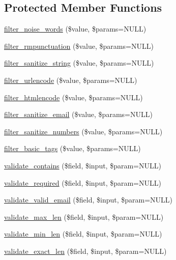 \subsection*{Protected Member Functions}
\begin{DoxyCompactItemize}
\item 
\hyperlink{class_g_u_m_p_ad17dfb17c7854c7928a488a7768de3d9}{filter\-\_\-noise\-\_\-words} (\$value, \$params=N\-U\-L\-L)
\item 
\hyperlink{class_g_u_m_p_ac8f9390932361b18cfd33caac8d294bb}{filter\-\_\-rmpunctuation} (\$value, \$params=N\-U\-L\-L)
\item 
\hyperlink{class_g_u_m_p_af05bd442cf962980f42bfa2280711829}{filter\-\_\-sanitize\-\_\-string} (\$value, \$params=N\-U\-L\-L)
\item 
\hyperlink{class_g_u_m_p_a760dff939f058032c57e192ae5dce5c7}{filter\-\_\-urlencode} (\$value, \$params=N\-U\-L\-L)
\item 
\hyperlink{class_g_u_m_p_ae4920dc6dcf3928104f5c1fb129227eb}{filter\-\_\-htmlencode} (\$value, \$params=N\-U\-L\-L)
\item 
\hyperlink{class_g_u_m_p_a87b49affe006c13c092fe46c19c19fce}{filter\-\_\-sanitize\-\_\-email} (\$value, \$params=N\-U\-L\-L)
\item 
\hyperlink{class_g_u_m_p_ad5a9851c54274c5feba157f7b5f8274a}{filter\-\_\-sanitize\-\_\-numbers} (\$value, \$params=N\-U\-L\-L)
\item 
\hyperlink{class_g_u_m_p_a60946b61ddadd75e9b96fd87a5d9c9f9}{filter\-\_\-basic\-\_\-tags} (\$value, \$params=N\-U\-L\-L)
\item 
\hyperlink{class_g_u_m_p_aefa3a07356a551afae8157880be7b091}{validate\-\_\-contains} (\$field, \$input, \$param=N\-U\-L\-L)
\item 
\hyperlink{class_g_u_m_p_ae7562d5f80c9d0870152758ad7b5b8d7}{validate\-\_\-required} (\$field, \$input, \$param=N\-U\-L\-L)
\item 
\hyperlink{class_g_u_m_p_af50c6ccf44e78f9be3d3087d93c02db0}{validate\-\_\-valid\-\_\-email} (\$field, \$input, \$param=N\-U\-L\-L)
\item 
\hyperlink{class_g_u_m_p_a3f433ecd7837ef40aee72eefbba49982}{validate\-\_\-max\-\_\-len} (\$field, \$input, \$param=N\-U\-L\-L)
\item 
\hyperlink{class_g_u_m_p_a9527495bc292ed914e75cf2da2a7ce99}{validate\-\_\-min\-\_\-len} (\$field, \$input, \$param=N\-U\-L\-L)
\item 
\hyperlink{class_g_u_m_p_a49a48d0c0c679a723c98f62358bb3e8a}{validate\-\_\-exact\-\_\-len} (\$field, \$input, \$param=N\-U\-L\-L)

\end{DoxyCompactItemize}
